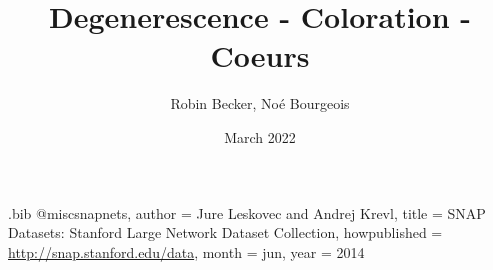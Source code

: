\RequirePackage{filecontents}

\begin{filecontents}{\jobname.bib}
@misc{snapnets,
author       = {Jure Leskovec and Andrej Krevl},
title        = {{SNAP Datasets}: {Stanford} Large Network Dataset Collection},
howpublished = {\url{http://snap.stanford.edu/data}},
month        = jun,
year         = 2014
}
\end{filecontents}

\documentclass{article}
\usepackage[utf8]{inputenc}
\usepackage[T1]{fontenc}
\usepackage[french]{babel}
\usepackage[parfill]{parskip}
\usepackage{amsmath}
\usepackage{amssymb}
\usepackage{amsfonts}
\usepackage{graphicx}
\usepackage{subfigure}
\usepackage[font={small}]{caption}
\usepackage{float}
\usepackage{listingsutf8}
\usepackage{fullpage}
\usepackage[nochapter]{vhistory}
\usepackage{hyperref}
\usepackage{titlesec}
\usepackage{xcolor}
\usepackage{verbatim}
\usepackage{graphicx}
\usepackage{subcaption}
\usepackage{comment}

\usepackage{natbib}
\usepackage{url}
\usepackage{algpseudocode}

\usepackage{adjustbox}



\newcommand*{\MyIncludeGraphicsMaxSize}[2][]{%
\begin{adjustbox}{max size={\textwidth}{\textheight}}
    \texttt{[image: \#2]}%
\end{adjustbox}
}


\hypersetup{
    colorlinks=true,
    linkcolor=blue,
    filecolor=magenta,
    urlcolor=cyan,
    pdfpagemode=FullScreen,
    }


\title{Degenerescence - Coloration - Coeurs}
\author{Robin Becker, Noé Bourgeois }
\date{March 2022}



\maketitle
\tableofcontents
\newpage

\section{Introduction}

